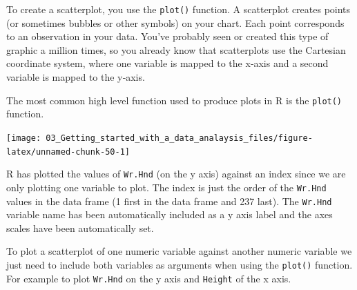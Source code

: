 \documentclass[
]{book}
\newenvironment{Shaded}{\begin{snugshade}}{\end{snugshade}}
\newcommand{\AttributeTok}[1]{\textcolor[rgb]{0.77,0.63,0.00}{#1}}
\newcommand{\DecValTok}[1]{\textcolor[rgb]{0.00,0.00,0.81}{#1}}
\newcommand{\FloatTok}[1]{\textcolor[rgb]{0.00,0.00,0.81}{#1}}
\newcommand{\FunctionTok}[1]{\textcolor[rgb]{0.00,0.00,0.00}{#1}}
\newcommand{\NormalTok}[1]{#1}
\newcommand{\SpecialCharTok}[1]{\textcolor[rgb]{0.00,0.00,0.00}{#1}}
\begin{document}
To create a scatterplot, you use the \texttt{plot()} function. A scatterplot creates points (or sometimes bubbles or other symbols) on your chart. Each point corresponds to an observation in your data. You've probably seen or created this type of graphic a million times, so you already know that scatterplots use the Cartesian coordinate system, where one variable is mapped to the x‐axis and a second variable is mapped to the y‐axis.

The most common high level function used to produce plots in R is the \texttt{plot()} function.

\begin{Shaded}
\end{Shaded}

\begin{center}\texttt{[image: 03\_Getting\_started\_with\_a\_data\_analaysis\_files/figure-latex/unnamed-chunk-50-1]} \end{center}

R has plotted the values of \texttt{Wr.Hnd} (on the y axis) against an index since we are only plotting one variable to plot. The index is just the order of the \texttt{Wr.Hnd} values in the data frame (1 first in the data frame and 237 last). The \texttt{Wr.Hnd} variable name has been automatically included as a y axis label and the axes scales have been automatically set.

To plot a scatterplot of one numeric variable against another numeric variable we just need to include both variables as arguments when using the \texttt{plot()} function. For example to plot \texttt{Wr.Hnd} on the y axis and \texttt{Height} of the x axis.

\begin{Shaded}
\end{Shaded}
\end{document}
